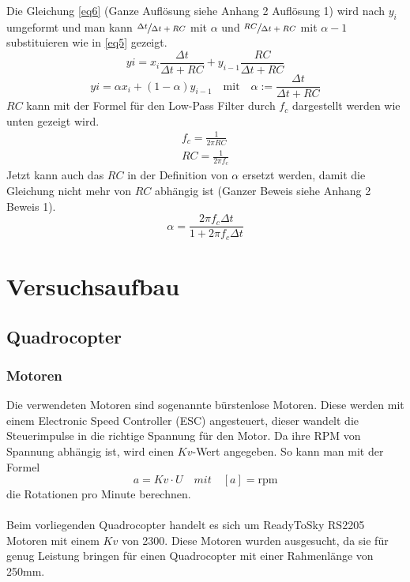 \documentclass[12pt,a4paper, ngerman]{article}
\begin{document}
\newpage
\noindent
Die Gleichung \ref{eq6} (Ganze Auflösung siehe Anhang 2 Auflösung 1) wird nach $y_{i}$ umgeformt und man kann $\sfrac{\Delta t}{\Delta t+RC}$  mit $\alpha$ und $\sfrac{RC}{\Delta t + RC}$ mit $\alpha-1$ substituieren wie in \ref{eq5} gezeigt.
\begin{equation} \label{eq6}
y{i}=x_{i}\frac{\Delta t}{\Delta t+RC} + y_{i-1}\frac{RC}{\Delta t+RC}
\end{equation} 
\begin{equation}\label{eq5}
y{i}=\alpha x_{i} + (1-\alpha)y_{i-1} \quad \text{mit} \quad \alpha:=\frac{\Delta t}{\Delta t+RC}
\end{equation}
$RC$ kann mit der Formel für den Low-Pass Filter durch $f_{c}$ dargestellt werden wie unten gezeigt wird.
\begin{align*}
f_{c} = \frac{1}{2\pi RC} \\
RC = \frac{1}{2\pi f_{c}} 
\end{align*}
Jetzt kann auch das $RC$ in der Definition von $\alpha$ ersetzt werden, damit die Gleichung nicht mehr von $RC$ abhängig ist (Ganzer Beweis siehe Anhang 2 Beweis 1).
\begin{equation*}
\alpha = \frac{2\pi f_{c}\Delta t}{1+2\pi f_{c}\Delta t} 
\end{equation*}
\newpage
\section{Versuchsaufbau}
\subsection{Quadrocopter}
\subsubsection{Motoren}
Die verwendeten Motoren sind sogenannte bürstenlose Motoren. Diese werden mit einem Electronic Speed Controller (ESC) angesteuert, dieser wandelt die Steuerimpulse in die richtige Spannung für den Motor. Da ihre RPM von Spannung abhängig ist, wird einen $Kv$-Wert angegeben. So kann man mit der Formel
\begin{equation}
a=Kv\cdot U \quad mit \quad [a]=\text{rpm}
\end{equation}
die Rotationen pro Minute berechnen.\\ \\
Beim vorliegenden Quadrocopter handelt es sich um ReadyToSky RS2205 Motoren mit einem $Kv$ von 2300. Diese Motoren wurden ausgesucht, da sie für genug Leistung bringen für einen Quadrocopter mit einer Rahmenlänge von 250mm.
\end{document}
